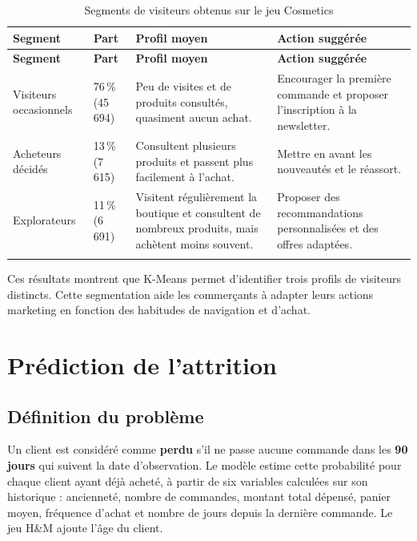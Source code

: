 \renewcommand{\arraystretch}{1.3}
\begin{longtable}{|p{3.2cm}|p{1.8cm}|p{5.2cm}|p{4.2cm}|}
\hline
\textbf{Segment} & \textbf{Part} & \textbf{Profil moyen} & \textbf{Action suggérée} \\
\hline
\endfirsthead
\hline
\textbf{Segment} & \textbf{Part} & \textbf{Profil moyen} & \textbf{Action suggérée} \\
\hline
\endhead

Visiteurs occasionnels &
76\,\% (45 694) &
Peu de visites et de produits consultés, quasiment aucun achat. &
Encourager la première commande et proposer l'inscription à la newsletter. \\
\hline

Acheteurs décidés &
13\,\% (7 615) &
Consultent plusieurs produits et passent plus facilement à l'achat. &
Mettre en avant les nouveautés et le réassort. \\
\hline

Explorateurs &
11\,\% (6 691) &
Visitent régulièrement la boutique et consultent de nombreux produits, mais achètent moins souvent. &
Proposer des recommandations personnalisées et des offres adaptées. \\
\hline

\caption{Segments de visiteurs obtenus sur le jeu Cosmetics}
\label{tab:segments}
\end{longtable}

Ces résultats montrent que K-Means permet d'identifier trois profils de visiteurs distincts. Cette segmentation aide les commerçants à adapter leurs actions marketing en fonction des habitudes de navigation et d'achat.





\section{Prédiction de l'attrition}
\subsection{Définition du problème}
Un client est considéré comme \textbf{perdu} s'il ne passe aucune commande dans les \textbf{90 jours} qui suivent la date d'observation. Le modèle estime cette probabilité pour chaque client ayant déjà acheté, à partir de six variables calculées sur son historique : ancienneté, nombre de commandes, montant total dépensé, panier moyen, fréquence d'achat et nombre de jours depuis la dernière commande. Le jeu H\&M ajoute l'âge du client.

